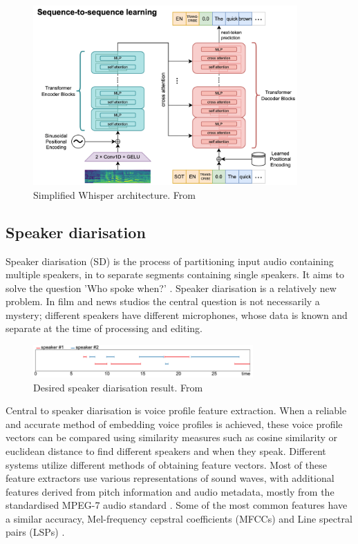 \documentclass[twoside]{uva-inf-bachelor-thesis}
\begin{document}
\begin{figure}
    \centering
    \includegraphics[width=0.9\textwidth]{images/whisperarch.png}
    \caption{Simplified Whisper architecture. From \cite{radford2023robust}}
    \label{fig:whisperarch}
\end{figure}

\subsection{Speaker diarisation}
Speaker diarisation (SD) is the process of partitioning input audio containing multiple speakers, in to separate segments containing single speakers. It aims to solve the question 'Who spoke when?' \cite{sahidullah2019speed}. Speaker diarisation is a relatively new problem. In film and news studios the central question is not necessarily a mystery; different speakers have different microphones, whose data is known and separate at the time of processing and editing. 

\begin{figure}[h]
    \centering
    \includegraphics[width=0.75\textwidth]{images/speakerdiaroutput2.png}
    \caption{Desired speaker diarisation result. From \cite{bredin2023pyannote}}
    \label{fig:sdo}
\end{figure}

Central to speaker diarisation is voice profile feature extraction. When a reliable and accurate method of embedding voice profiles is achieved, these voice profile vectors can be compared using similarity measures such as cosine similarity or euclidean distance to find different speakers and when they speak. Different systems utilize different methods of obtaining feature vectors. Most of these feature extractors use various representations of sound waves, with additional features derived from pitch information and audio metadata, mostly from the standardised MPEG-7 audio standard \cite{kotti2008speaker, lu2002speaker}. Some of the most common features have a similar accuracy, Mel-frequency cepstral coefficients
(MFCCs) \cite{gook04} and Line spectral pairs (LSPs) \cite{lu2002speaker}. 
\end{document}
